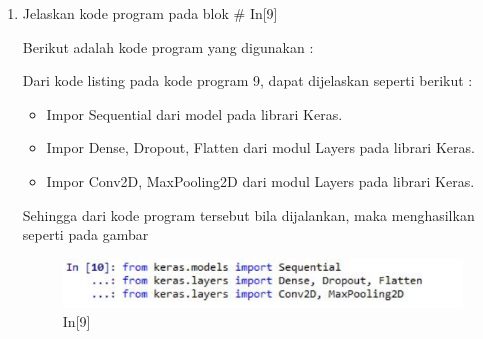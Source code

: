 \begin{enumerate}
\begin{figure}[!htbp]
\end{figure}
\item Jelaskan kode program pada blok \# In[9]
\par Berikut adalah kode program yang digunakan :

\par Dari kode listing pada kode program 9, dapat dijelaskan seperti berikut :
\begin{itemize}
\item Impor Sequential dari model pada librari Keras.
\item Impor Dense, Dropout, Flatten dari modul Layers pada librari Keras.
\item Impor Conv2D, MaxPooling2D dari modul Layers pada librari Keras.
\end{itemize}
\par Sehingga dari kode program tersebut bila dijalankan, maka menghasilkan seperti pada gambar 
\begin{figure}[!htbp]
	\centerline{\includegraphics[width=1\textwidth]{figures/andi/p9.PNG}}
	\caption{In[9]}
	

\end{figure}
\end{enumerate}
